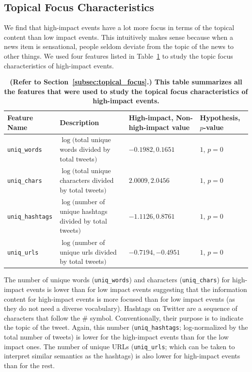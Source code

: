 \documentclass[10pt,letterpaper]{article}
\begin{document}
\subsection{Topical Focus Characteristics}
We find that high-impact events have a lot more focus in terms of the
topical content than low impact events. This intuitively makes sense
because when a news item is sensational, people seldom deviate from
the topic of the news to other things. We used four features listed in
Table~\ref{tab:topical_focus} to study the topic focus characteristics
of high-impact events.

\begin{table}
  \centering
  {\scriptsize
    \begin{tabular}{llll}
      \toprule
      Feature Name &  \multicolumn{1}{l}{Description} & High-impact, Non-high-impact value & Hypothesis, $p$-value\\
      \midrule
      \texttt{uniq\_words} & \pbox{20cm}{$\log($total unique words \\divided by total tweets$)$} & $-0.1982, 0.1651$ & $1$, $p = 0$ \\
      \midrule
      \texttt{uniq\_chars} & \pbox{20cm}{$\log($total unique characters \\divided by total tweets$)$} & $2.0009, 2.0456$ & $1$, $p = 0$ \\
      \midrule
      \texttt{uniq\_hashtags} & \pbox{20cm}{$\log($number of unique hashtags\\ divided by total tweets$)$} & $-1.1126, 0.8761$ & $1$, $p = 0$ \\
      \midrule
      \texttt{uniq\_urls} & \pbox{20cm}{$\log($number of unique urls \\divided by total tweets$)$} & $-0.7194, -0.4951$ & $1$, $p = 0$ \\
      \bottomrule
    \end{tabular}
  }
  \caption{\textbf{(Refer to Section~\ref{subsec:topical_focus}.)
      This table summarizes all the features that were used to study the topical focus characteristics
      of high-impact events.}}
  \label{tab:topical_focus}
\end{table}

The number of unique words (\texttt{uniq\_words}) and characters
(\texttt{uniq\_chars}) for high-impact events is lower than for low
impact events suggesting that the information content for high-impact
events is more focused than for low impact events (as they do not need
a diverse vocabulary). Hashtags on Twitter are a sequence of
characters that follow the \# symbol. Conventionally, their purpose is
to indicate the topic of the tweet. Again, this number
(\texttt{uniq\_hashtags}; log-normalized by the total number of
tweets) is lower for the high-impact events than for the low impact
ones. The number of unique URLs (\texttt{uniq\_urls}; which can be
taken to interpret similar semantics as the hashtags) is also lower
for high-impact events than for the rest. 
\end{document}

